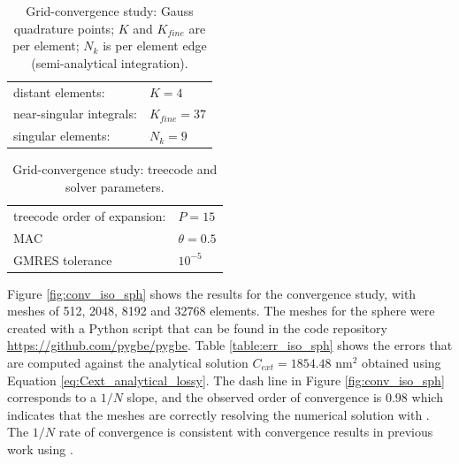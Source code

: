 \begin{table}%
    \centering
    \caption{\label{table:quadparams1} Grid-convergence study: Gauss quadrature points; 
    $K$ and $K_{fine}$ are per element; $N_k $ is per element edge (semi-analytical integration). } 
    \begin{tabular}{l l}
    \hline%
     distant elements: & $K=4$ \\
     near-singular integrals:   & $ K_{fine}=37$ \\
     singular elements:  & $N_k =9$ \\
    \hline%
    \end{tabular}
\end{table}


\begin{table}%
    \centering
    \caption{\label{table:treeparams1} Grid-convergence study: treecode and solver parameters.} 
    \begin{tabular}{l l}
    \hline%
    treecode order of expansion: & $P=15$\\
    MAC                          & $\theta=0.5$\\
    GMRES tolerance                    & $10^{-5}$\\
    \hline%
    \end{tabular}
\end{table}

Figure \ref{fig:conv_iso_sph} shows the results for the convergence study, with meshes of 512, 2048, 
8192 and 32768 elements. The meshes for the sphere were created with a Python script that can be found in the
code repository \url{https://github.com/pygbe/pygbe}. Table \ref{table:err_iso_sph} shows the errors that are computed against
the analytical solution $C_{ext} = 1854.48$ nm$^2$ obtained using Equation \eqref{eq:Cext_analytical_lossy}.
The dash line in Figure \ref{fig:conv_iso_sph} corresponds to a $1/N$ slope, and the observed order of 
convergence is $0.98$ which indicates that the meshes are correctly resolving the numerical solution with \pygbe.
The $1/N$ rate of convergence is consistent with convergence results in
previous work using \pygbe \cite{CooperBardhanBarba2013}. 

